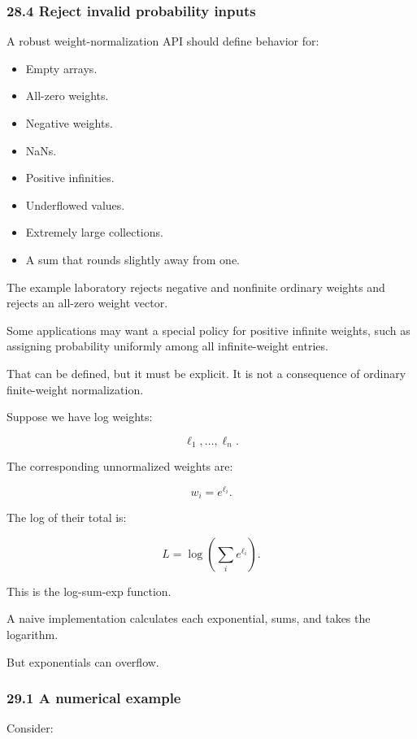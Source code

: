 \subsubsection{28.4 Reject invalid probability inputs}\label{reject-invalid-probability-inputs}

A robust weight-normalization API should define behavior for:

\begin{itemize}
\tightlist
\item
  Empty arrays.
\item
  All-zero weights.
\item
  Negative weights.
\item
  NaNs.
\item
  Positive infinities.
\item
  Underflowed values.
\item
  Extremely large collections.
\item
  A sum that rounds slightly away from one.
\end{itemize}

The example laboratory rejects negative and nonfinite ordinary weights and rejects an all-zero weight vector.

Some applications may want a special policy for positive infinite weights, such as assigning probability uniformly among all infinite-weight entries.

That can be defined, but it must be explicit. It is not a consequence of ordinary finite-weight normalization.

Suppose we have log weights:

\[ \ell_1,\ldots,\ell_n. \]

The corresponding unnormalized weights are:

\[ w_i=e^{\ell_i}. \]

The log of their total is:

\[ \boxed{ L=\log\left(\sum_ie^{\ell_i}\right) }. \]

This is the log-sum-exp function.

A naive implementation calculates each exponential, sums, and takes the logarithm.

But exponentials can overflow.

\subsubsection{29.1 A numerical example}\label{a-numerical-example}

Consider:

